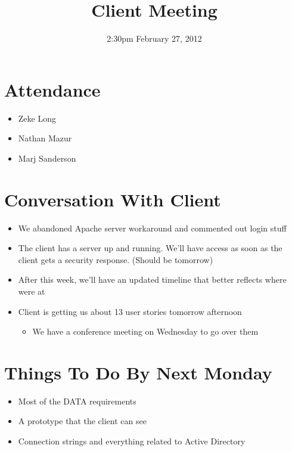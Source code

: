 \documentclass{article}
\begin{document}
\title{Client Meeting}
\date{2:30pm February 27, 2012}
\maketitle

\section{Attendance}
\begin{itemize}
\item Zeke Long
\item Nathan Mazur
\item Marj Sanderson
\end{itemize}


\section{Conversation With Client}
\begin{itemize}
\item We abandoned Apache server workaround and commented out login stuff
\item The client has a server up and running. We'll have access as soon as the client gets a security response. (Should be tomorrow)
\item After this week, we'll have an updated timeline that better reflects where were at
\item Client is getting us about 13 user stories tomorrow afternoon
	\begin{itemize}
	\item We have a conference meeting on Wednesday to go over them
	\end{itemize}
\end{itemize}

\section{Things To Do By Next Monday}
\begin{itemize}
\item Most of the DATA requirements
\item A prototype that the client can see
\item Connection strings and everything related to Active Directory
\end{itemize}
\end{document}
